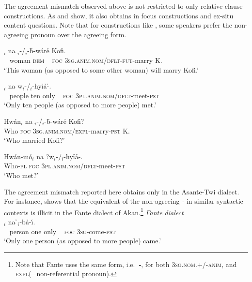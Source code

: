 \documentclass[output=paper]{LSP/langsci}
\begin{document}
\z
\z



The agreement mismatch observed above is not restricted to only relative clause constructions. As  and  show, it also obtains in focus constructions and  ex-situ content questions. Note that for constructions like , some speakers prefer the non-agreeing pronoun over the agreeing form. 
 

        

\ea\label{ex:korsah:18} 
\ea\label{ex:korsah:18a}
$_i$ na  \oor$_i$-/\eer$_i$-b\h \eer-w{\'{a}}r\h e Kofi.\\
 ~ woman \textsc{dem} ~ \textsc{foc} \textsc{3sg.anim.nom}/\textsc{dflt}-\textsc{fut}-marry K. \\
\glt  `This woman (as opposed to some other woman) will marry Kofi.'

\ex\label{ex:korsah:18b}
$_i$ na  w\oor$_i$-/\eer$_i$-hy\h i\h a-\h \eer.\\
 ~ people ten only ~ \textsc{foc} \textsc{3pl.anim.nom}/\textsc{dflt}-meet-\textsc{pst} \\
\glt  `Only ten people (as opposed to more people) met.'

\z
\z


\ea\label{ex:korsah:19} 
\ea\label{ex:korsah:19a}
\gll Hw{\'{a}}n$_i$ na  \oor$_i$-/\eer$_i$-b\h \eer-w{\'{a}}r\h e Kofi?\\
Who \textsc{foc} \textsc{3sg.anim.nom}/\textsc{expl}-marry-\textsc{pst} K. \\
\glt  `Who married Kofi?'

\ex\label{ex:korsah:19b}
\gll Hw{\'{a}}n-m{\'{o}}$_i$ na ?w\oor$_i$-/\eer$_i$-hy\h i\h a-\eer.\\
Who-\textsc{pl} \textsc{foc} \textsc{3pl.anim.nom}/\textsc{dflt}-meet-\textsc{pst} \\
\glt  `Who met?'

\z
\z

The agreement mismatch reported here obtains only in the Asante-Twi dialect.
For instance,  shows that the equivalent of the non-agreeing \textit{\eer-} in similar syntactic contexts  is illicit in the Fante dialect of Akan.\footnote{Note that Fante uses the same  form, i.e.\ \textit{\textbf{\oor-}}, for both \textsc{3sg.nom.+/-anim}, and \textsc{expl}(=non-referential pronoun).} 
\ea\label{ex:korsah:20}  \textit{Fante dialect} \\
\ea\label{ex:korsah:20a}
\gll [ Ny{\'{i}}p{\'{a}} k{\'{o}}r p{\'{\eer}} ]$_i$ na  \h \oor$_i$-b\h a-{\'{\i}}.\\
 ~ person one only ~ \textsc{foc} \textsc{3sg}-come-\textsc{pst}\\
\glt  `Only one person (as opposed to more people) came.'
\end{document}

